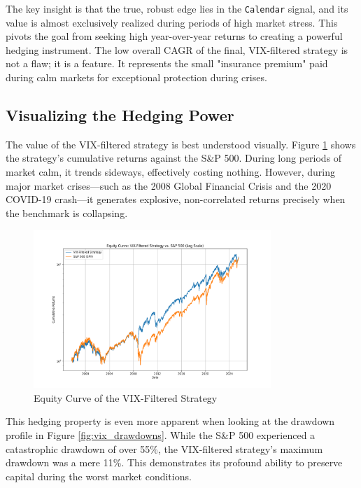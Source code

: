 \documentclass{article}
\begin{document}
The key insight is that the true, robust edge lies in the \texttt{Calendar} signal, and its value is almost exclusively realized during periods of high market stress. This pivots the goal from seeking high year-over-year returns to creating a powerful hedging instrument. The low overall CAGR of the final, VIX-filtered strategy is not a flaw; it is a feature. It represents the small "insurance premium" paid during calm markets for exceptional protection during crises.

\subsection{Visualizing the Hedging Power}
The value of the VIX-filtered strategy is best understood visually. Figure \ref{fig:vix_equity_curve} shows the strategy's cumulative returns against the S\&P 500. During long periods of market calm, it trends sideways, effectively costing nothing. However, during major market crises---such as the 2008 Global Financial Crisis and the 2020 COVID-19 crash---it generates explosive, non-correlated returns precisely when the benchmark is collapsing.

\begin{figure}[htbp]
    \centering
    \includegraphics[width=0.8\textwidth]{plots/plot_vix_strategy_equity_curve.png}
    \caption{Equity Curve of the VIX-Filtered Strategy}
    \label{fig:vix_equity_curve}
\end{figure}

This hedging property is even more apparent when looking at the drawdown profile in Figure \ref{fig:vix_drawdowns}. While the S\&P 500 experienced a catastrophic drawdown of over 55\%, the VIX-filtered strategy's maximum drawdown was a mere 11\%. This demonstrates its profound ability to preserve capital during the worst market conditions.
\end{document}
